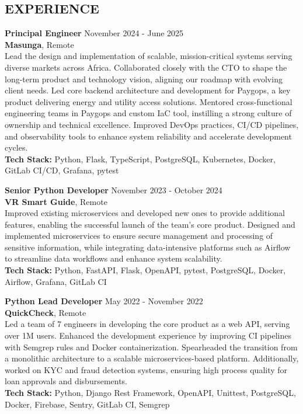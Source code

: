 \documentclass[margin, 10pt]{res} %
\begin{document}
\begin{resume}
    \section{EXPERIENCE}

    \textbf{Principal Engineer} \hfill November 2024 - June 2025\\
    \textbf{Masunga}, Remote\\
    Lead the design and implementation of scalable, mission-critical systems serving diverse markets across Africa. Collaborated closely with the CTO to shape the long-term product and technology vision, aligning our roadmap with evolving client needs. Led core backend architecture and development for Paygops, a key product delivering energy and utility access solutions. Mentored cross-functional engineering teams in Paygops and custom IaC tool, instilling a strong culture of ownership and technical excellence. Improved DevOps practices, CI/CD pipelines, and observability tools to enhance system reliability and accelerate development cycles.\\
    \textbf{Tech Stack:} Python, Flask, TypeScript, PostgreSQL, Kubernetes, Docker, GitLab CI/CD, Grafana, pytest


    \textbf{Senior Python Developer} \hfill November 2023 - October 2024\\
    \textbf{VR Smart Guide}, Remote\\
    Improved existing microservices and developed new ones to provide additional features, enabling the successful launch of the team's core product. Designed and implemented microservices to ensure secure management and processing of sensitive information, while integrating data-intensive platforms such as Airflow to streamline data workflows and enhance system scalability.\\
    \textbf{Tech Stack:} Python, FastAPI, Flask, OpenAPI, pytest, PostgreSQL, Docker, Airflow, Grafana, GitLab CI

    \textbf{Python Lead Developer} \hfill May 2022 - November 2022\\
    \textbf{QuickCheck}, Remote\\
    Led a team of 7 engineers in developing the core product as a web API, serving over 1M users. Enhanced the development experience by improving CI pipelines with Semgrep rules and Docker containerization. Spearheaded the transition from a monolithic architecture to a scalable microservices-based platform. Additionally, worked on KYC and fraud detection systems, ensuring high process quality for loan approvals and disbursements.\\
    \textbf{Tech Stack:} Python, Django Rest Framework, OpenAPI, Unittest, PostgreSQL, Docker, Firebase, Sentry, GitLab CI, Semgrep



\end{resume}
\end{document}
